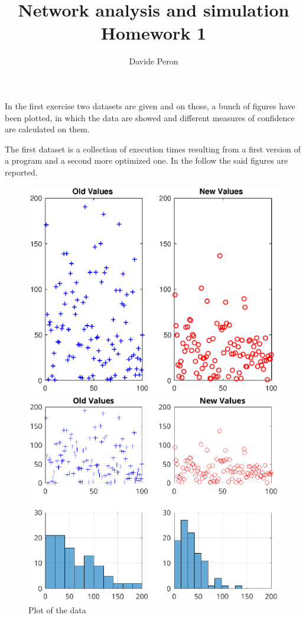 \documentclass[11pt,a4paper]{article}
\title{\blue Network analysis and simulation\\ Homework 1}
\author{Davide Peron}
\date{}
\begin{document}
\maketitle
\section{}
In the first exercise two datasets are given and on those, a bunch of figures have been plotted, in which the data are showed and different measures of confidence are calculated on them.

The first dataset is a collection of execution times resulting from a first version of a program and a second more optimized one.
In the follow the said figures are reported.

\begin{figure}[ht]
	\centering
	\begin{minipage}{0.45\textwidth}
		\centering
		\includegraphics[width=\textwidth]{ex1fig2_1a}
		\caption{Plot of the data}
		\label{fig:data_exec}
	\end{minipage}
	\begin{minipage}{0.45\textwidth}
		\centering
		\includegraphics[width=\textwidth]{ex1fig2_1}

\end{minipage}
\end{figure}
\end{document}
